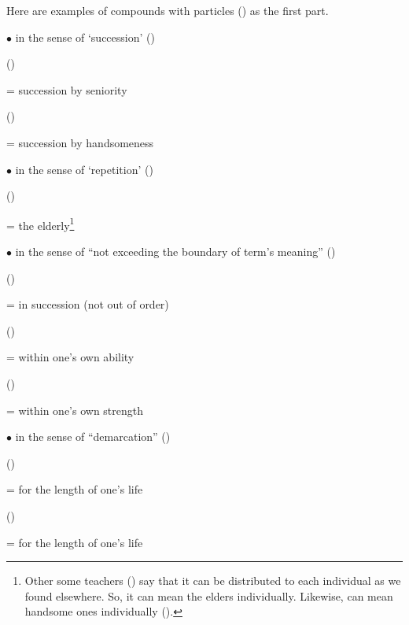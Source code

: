 \bigskip
Here are examples of compounds with particles () as the first part.

$\bullet$  in the sense of `succession' ()\par
{} ()\par \hspace{3mm} = succession by seniority\par
{} ()\par \hspace{3mm} = succession by handsomeness

$\bullet$  in the sense of `repetition' ()\par
{} ()\par \hspace{3mm} = the elderly\footnote{Other some teachers () say that it can be distributed to each individual as we found elsewhere. So, it can mean the elders individually. Likewise,  can mean handsome ones individually ().}\par

$\bullet$  in the sense of ``not exceeding the boundary of term's meaning'' ()\par
{} ()\par \hspace{3mm} = in succession (not out of order)\par
{} ()\par \hspace{3mm} = within one's own ability\par
{} ()\par \hspace{3mm} = within one's own strength

$\bullet$  in the sense of ``demarcation'' ()\par
{} ()\par \hspace{3mm} = for the length of one's life\par
{} ()\par \hspace{3mm} = for the length of one's life

